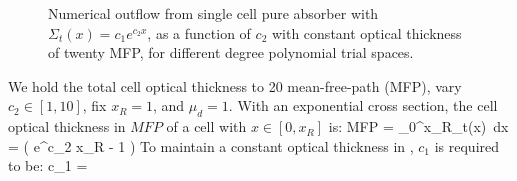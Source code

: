 \begin{figure}[!htp]
\begin{center}
{}
\end{center}
\caption{Numerical outflow from single cell pure absorber with $\Sigma_t(x) = c_1e^{c_2 x}$, as a function of $c_2$ with constant optical thickness of twenty MFP, for different degree polynomial trial spaces.}
\label{fig:exp_outflow}
\end{figure}
We hold the total cell optical thickness to 20 mean-free-path (MFP), vary $c_2 \in [1,10]$, fix $x_R=1$, and $\mu_d =1$.
With an exponential cross section, the cell optical thickness in $MFP$ of a cell  with $x\in[0,x_R]$ is:
\benum
MFP = \int_{0}^{x_R}{\Sigma_t(x)~dx} = \left( e^{c_2 x_R} - 1 \right) \pep
\label{eq:chap3_mfp_tot} 
\eenum
To maintain a constant optical thickness in , $c_1$ is required to be:
\benum
c_1 = \pep
\eenum
